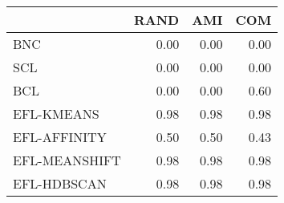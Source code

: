 \begin{tabular}{lrrr}
\toprule
 & RAND & AMI & COM \\
\midrule
BNC & 0.00 & 0.00 & 0.00 \\
SCL & 0.00 & 0.00 & 0.00 \\
BCL & 0.00 & 0.00 & 0.60 \\
EFL-KMEANS & 0.98 & 0.98 & 0.98 \\
EFL-AFFINITY & 0.50 & 0.50 & 0.43 \\
EFL-MEANSHIFT & 0.98 & 0.98 & 0.98 \\
EFL-HDBSCAN & 0.98 & 0.98 & 0.98 \\
\bottomrule
\end{tabular}
